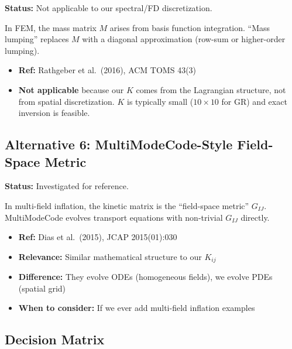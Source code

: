 \textbf{Status:} Not applicable to our spectral/FD discretization.

In FEM, the mass matrix $M$ arises from basis function integration. ``Mass lumping'' replaces $M$ with a diagonal approximation (row-sum or higher-order lumping).

\begin{itemize}
  \item \textbf{Ref:} Rathgeber et al.\ (2016), ACM TOMS 43(3)
  \item \textbf{Not applicable} because our $K$ comes from the Lagrangian structure, not from spatial discretization. $K$ is typically small ($10\times 10$ for GR) and exact inversion is feasible.
\end{itemize}


\subsection{Alternative 6: MultiModeCode-Style Field-Space Metric}
\label{sec:kinetic-alt6}

\textbf{Status:} Investigated for reference.

In multi-field inflation, the kinetic matrix is the ``field-space metric'' $G_{IJ}$. MultiModeCode evolves transport equations with non-trivial $G_{IJ}$ directly.

\begin{itemize}
  \item \textbf{Ref:} Dias et al.\ (2015), JCAP 2015(01):030
  \item \textbf{Relevance:} Similar mathematical structure to our $K_{ij}$
  \item \textbf{Difference:} They evolve ODEs (homogeneous fields), we evolve PDEs (spatial grid)
  \item \textbf{When to consider:} If we ever add multi-field inflation examples
\end{itemize}


\subsection{Decision Matrix}
\label{sec:kinetic-decision}

